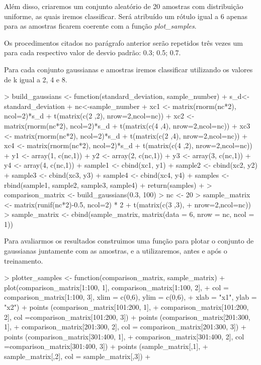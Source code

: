\documentclass[12pt]{article}
\begin{document}
  \par Além disso, criaremos um conjunto aleatório de 20 amostras com distribuição uniforme, as quais iremos classificar. Será atribuído um rótulo igual a 6 apenas para as amostras ficarem coerente com a função \textit{plot\_samples}.

  \par Os procedimentos citados no parágrafo anterior serão repetidos três vezes um para cada respectivo valor de desvio padrão: 0.3; 0.5; 0.7.
  
  \par Para cada conjunto gaussianas e amostras iremos classificar utilizando os valores de k igual a 2, 4 e 8. 
\begin{Schunk}
\begin{Sinput}
> build_gaussians <- function(standard_deviation, sample_number){
+   s_d<-standard_deviation
+   nc<-sample_number
+   xc1 <- matrix(rnorm(nc*2), ncol=2)*s_d + t(matrix(c(2 ,2), nrow=2,ncol=nc))
+   xc2 <- matrix(rnorm(nc*2), ncol=2)*s_d + t(matrix(c(4 ,4), nrow=2,ncol=nc))
+   xc3 <- matrix(rnorm(nc*2), ncol=2)*s_d + t(matrix(c(2 ,4), nrow=2,ncol=nc))
+   xc4 <- matrix(rnorm(nc*2), ncol=2)*s_d + t(matrix(c(4 ,2), nrow=2,ncol=nc))
+   y1 <- array(1, c(nc,1))
+   y2 <- array(2, c(nc,1))
+   y3 <- array(3, c(nc,1))
+   y4 <- array(4, c(nc,1))
+   sample1 <- cbind(xc1, y1)
+   sample2 <- cbind(xc2, y2)
+   sample3 <- cbind(xc3, y3)
+   sample4 <- cbind(xc4, y4)
+   samples <- rbind(sample1, sample2, sample3, sample4)
+   return(samples)
+ }
> comparison_matrix <- build_gaussians(0.3, 100)
> nc <- 20
> sample_matrix <- matrix(runif(nc*2)-0.5, ncol=2) * 2 + t(matrix(c(3 ,3),
+                                                         nrow=2,ncol=nc))
> sample_matrix <- cbind(sample_matrix, matrix(data = 6, nrow = nc, ncol = 1))
\end{Sinput}
\end{Schunk}
  \par Para avaliarmos os resultados construimos uma função para plotar o conjunto de gaussianas juntamente com as amostras, e a utilizaremos, antes e após o treinamento. 
  
\begin{Schunk}
\begin{Sinput}
> plotter_samples <- function(comparison_matrix, sample_matrix){
+   plot(comparison_matrix[1:100, 1], comparison_matrix[1:100, 2],
+        col = comparison_matrix[1:100, 3], xlim = c(0,6), ylim = c(0,6),
+        xlab = "x1", ylab = "x2")
+   points (comparison_matrix[101:200, 1],
+           comparison_matrix[101:200, 2], col =comparison_matrix[101:200, 3])
+   points (comparison_matrix[201:300, 1],
+           comparison_matrix[201:300, 2], col =  comparison_matrix[201:300, 3])
+   points (comparison_matrix[301:400, 1],
+           comparison_matrix[301:400, 2], col =comparison_matrix[301:400, 3])
+   points (sample_matrix[,1],
+           sample_matrix[,2], col = sample_matrix[,3])
+ }
\end{Sinput}
\end{Schunk}
\end{document}
